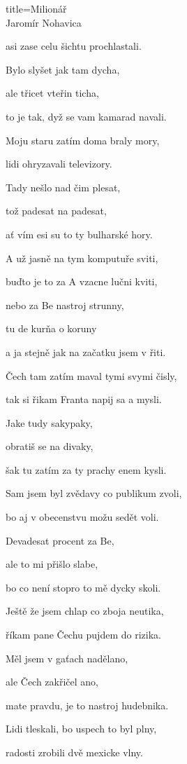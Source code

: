\begin{song}{title=\predtitle\centering Milionář \\\large Jaromír Nohavica  \vspace*{-0.3cm}}
{\begin{centerjustified}
\begin{varwidth}[t]{0.48\textwidth}
asi zase celu šichtu prochlastali.

Bylo slyšet jak tam dycha,

ale třicet vteřin ticha,

to je tak, dyž se vam kamarad navali.

\sloka
Moju staru zatím doma braly mory,

lidi ohryzavali televizory.



\end{varwidth}\mezisloupci\begin{varwidth}[t]{0.53\textwidth}\setlength{\parindent}{\pindent}
\vspace*{0.60cm} %

Tady nešlo nad čim plesat,

tož padesat na padesat,

ať vím esi su to ty bulharské hory.

\sloka
A už jasně na tym komputuře sviti,

buďto je to za A vzacne lučni kviti,

nebo za Be nastroj strunny,

tu de kurňa o koruny

a ja stejně jak na začatku jsem v řiti.

\sloka
Čech tam zatím maval tymi svymi čisly,

tak si řikam Franta napij sa a mysli.

Jake tudy sakypaky,

obratiš se na divaky,

šak tu zatím za ty prachy enem kysli.

\sloka
Sam jsem byl zvědavy co publikum zvoli,

bo aj v obecenstvu možu sedět voli.

Devadesat procent za Be,

ale to mi přišlo slabe,

bo co není stopro to mě dycky skoli.

\sloka
Ještě že jsem chlap co zboja neutika,

říkam pane Čechu pujdem do rizika.

Měl jsem v gaťach nadělano,

ale Čech zakřičel ano,

mate pravdu, je to nastroj hudebnika.

\sloka
Lidi tleskali, bo uspech to byl plny,

radosti zrobili dvě mexicke vlny.


\end{varwidth}
\end{centerjustified}}
\end{song}
